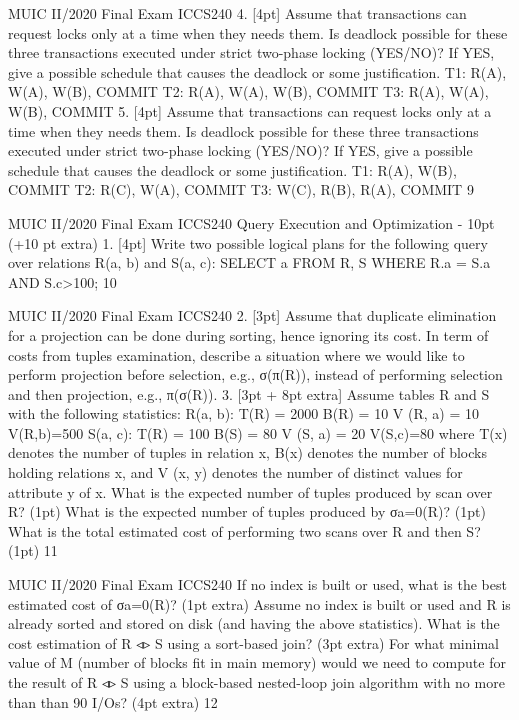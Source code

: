 \documentclass[a4paper, 11pt]{article}
\begin{document}
MUIC II/2020 Final Exam ICCS240
4. [4pt] Assume that transactions can request locks only at a time when they needs them. Is deadlock possible for these three transactions executed under strict two-phase locking (YES/NO)? If YES, give a possible schedule that causes the deadlock or some justification. T1: R(A), W(A), W(B), COMMIT
     T2:  R(A), W(A), W(B), COMMIT
     T3:  R(A), W(A), W(B), COMMIT
     5. [4pt] Assume that transactions can request locks only at a time when they needs them. Is deadlock possible for these three transactions executed under strict two-phase locking (YES/NO)? If YES, give a possible schedule that causes the deadlock or some justification. T1: R(A), W(B), COMMIT
  T2:  R(C), W(A), COMMIT
  T3:  W(C), R(B), R(A), COMMIT
    9

MUIC II/2020 Final Exam ICCS240
Query Execution and Optimization - 10pt (+10 pt extra)
1. [4pt] Write two possible logical plans for the following query over relations R(a, b) and S(a, c): SELECT a FROM R, S WHERE R.a = S.a AND S.c>100;
     10

MUIC II/2020 Final Exam ICCS240
2. [3pt] Assume that duplicate elimination for a projection can be done during sorting, hence ignoring its cost. In term of costs from tuples examination, describe a situation where we would like to perform projection before selection, e.g., σ(π(R)), instead of performing selection and then projection, e.g., π(σ(R)).
     3. [3pt + 8pt extra] Assume tables R and S with the following statistics:
 R(a, b):
T(R) = 2000 B(R) = 10
V (R, a) = 10 V(R,b)=500
S(a, c): T(R) = 100 B(S) = 80
V (S, a) = 20 V(S,c)=80
  where T(x) denotes the number of tuples in relation x, B(x) denotes the number of blocks holding relations x, and V (x, y) denotes the number of distinct values for attribute y of x.
What is the expected number of tuples produced by scan over R? (1pt)
What is the expected number of tuples produced by σa=0(R)? (1pt)
What is the total estimated cost of performing two scans over R and then S? (1pt)
            11

MUIC II/2020 Final Exam ICCS240
If no index is built or used, what is the best estimated cost of σa=0(R)? (1pt extra)
     Assume no index is built or used and R is already sorted and stored on disk (and having the above statistics). What is the cost estimation of R ◃▹ S using a sort-based join? (3pt extra)
    For what minimal value of M (number of blocks fit in main memory) would we need to compute for the result of R ◃▹ S using a block-based nested-loop join algorithm with no more than than 90 I/Os? (4pt extra)
    12
\end{document}
